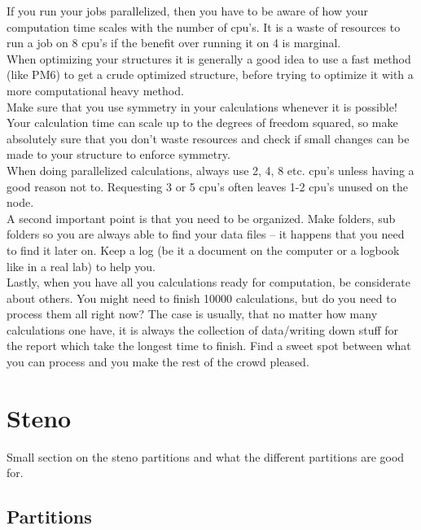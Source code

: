\documentclass{article}
\begin{document}
If you run your jobs parallelized, then you have to be aware of how your computation time scales with the number of cpu's.
It is a waste of resources to run a job on 8 cpu's if the benefit over running it on 4 is marginal.\\

When optimizing your structures it is generally a good idea to use a fast method (like PM6) to get a crude optimized structure, before trying to optimize it with a more computational heavy method.\\

Make sure that you use symmetry in your calculations whenever it is possible!
Your calculation time can scale up to the degrees of freedom squared, so make absolutely sure that you don't waste resources and check if small changes can be made to your structure to enforce symmetry.\\

When doing parallelized calculations, always use 2, 4, 8 etc. cpu's unless having a good reason not to.
Requesting 3 or 5 cpu's often leaves 1-2 cpu's unused on the node.\\

A second important point is that you need to be organized.
Make folders, sub folders so you are always able to find your data files – it happens that you need to find it later on.
Keep a log (be it a document on the computer or a logbook like in a real lab) to help you.\\

Lastly, when you have all you calculations ready for computation, be considerate about others.
You might need to finish 10000 calculations, but do you need to process them all right now?
The case is usually, that no matter how many calculations one have, it is always the collection of data/writing down stuff for the report which take the longest time to finish.
Find a sweet spot between what you can process and you make the rest of the crowd pleased.\\


\newpage
\section{Steno}

Small section on the steno partitions  and what the different partitions are good for.

\subsection*{Partitions}
\end{document}

